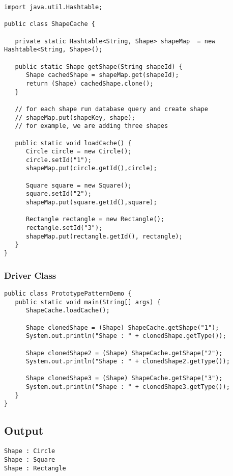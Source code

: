 \begin{verbatim}
import java.util.Hashtable;

public class ShapeCache {
	
   private static Hashtable<String, Shape> shapeMap  = new Hashtable<String, Shape>();

   public static Shape getShape(String shapeId) {
      Shape cachedShape = shapeMap.get(shapeId);
      return (Shape) cachedShape.clone();
   }

   // for each shape run database query and create shape
   // shapeMap.put(shapeKey, shape);
   // for example, we are adding three shapes
   
   public static void loadCache() {
      Circle circle = new Circle();
      circle.setId("1");
      shapeMap.put(circle.getId(),circle);

      Square square = new Square();
      square.setId("2");
      shapeMap.put(square.getId(),square);

      Rectangle rectangle = new Rectangle();
      rectangle.setId("3");
      shapeMap.put(rectangle.getId(), rectangle);
   }
}
\end{verbatim}

\subsubsection{Driver Class}

\begin{verbatim}
public class PrototypePatternDemo {
   public static void main(String[] args) {
      ShapeCache.loadCache();

      Shape clonedShape = (Shape) ShapeCache.getShape("1");
      System.out.println("Shape : " + clonedShape.getType());		

      Shape clonedShape2 = (Shape) ShapeCache.getShape("2");
      System.out.println("Shape : " + clonedShape2.getType());		

      Shape clonedShape3 = (Shape) ShapeCache.getShape("3");
      System.out.println("Shape : " + clonedShape3.getType());		
   }
}
\end{verbatim}

\subsection{Output}

\begin{verbatim}
Shape : Circle
Shape : Square
Shape : Rectangle
\end{verbatim}